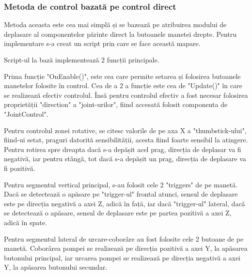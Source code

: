 \subsubsection{Metoda de control bazată pe control direct}
Metoda aceasta este cea mai simplă și se bazează pe atribuirea modului de deplasare al componentelor părinte direct la butoanele manetei drepte. Pentru implementare s-a creat un script prin care se face această mapare.

Script-ul la bază implementează 2 funcții principale.

Prima funcție "OnEnable()", este cea care permite setarea și folosirea butoanele manetelor folosite în control. Cea de a 2 a funcție este cea de "Update()" în care se realizează efectiv controlul. 
Însă pentru controlul efectiv a fost necesar folosirea proprietății "direction" a "joint-urilor", fiind accesată folosit componenta de "JointControl".

Pentru controlul zonei rotative, se citesc valorile de pe axa X a "thumbstick-ului", fiind-ui setat, praguri datorită sensibilității, acesta fiind foarte sensibil la atingere. Pentru rotirea spre dreapta dacă s-a depășit acel prag, direcția de deplasar va fi negativă, iar pentru stângă, tot dacă s-a depășit un prag, direcția de deplasare va fi pozitivă.


Pentru segmentul vertical principal, s-au folosit cele 2 "triggers" de pe manetă. Dacă se detectează o apăsare pe "trigger-ul" frontal atunci, sensul de deplasare este pe direcția negativă a axei Z, adică în  față, iar dacă "trigger-ul" lateral, dacă se detectează o apăsare, sensul de deplasare este pe partea pozitivă a axei Z, adică în spate.

Pentru segmentul lateral de  urcare-coborâre au fost folosite cele 2 butoane de pe manetă. Coborârea pompei se realizează pe direcția pozitivă a axei Y, la apăsarea butonului principal, iar urcarea pompei 
se realizează pe direcția negativă a axei Y, la apăsarea butonului secundar.



